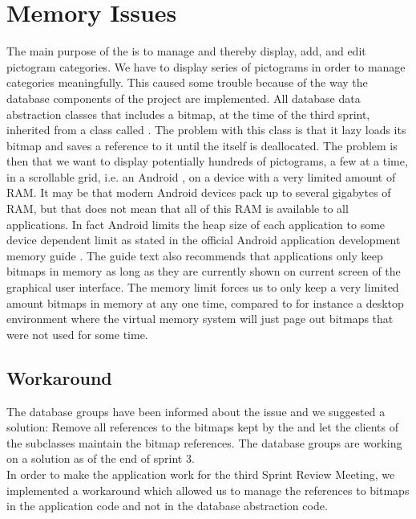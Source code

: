 
\section{Memory Issues}
\label{sec:memory_issues}

The main purpose of the \ct is to manage and thereby display, add, and edit pictogram categories. We have to display series of pictograms in order to manage categories meaningfully. This caused some trouble because of the way the database components of the project are implemented. All database data abstraction classes that includes a bitmap, at the time of the third sprint, inherited from a class called . The problem with this class is that it lazy loads its bitmap and saves a reference to it until the  itself is deallocated. The problem is then that we want to display potentially hundreds of pictograms, a few at a time, in a scrollable grid, i.e. an Android , on a device with a very limited amount of RAM. It may be that modern Android devices pack up to several gigabytes of RAM, but that does not mean that all of this RAM is available to all applications. In fact Android limits the heap size of each application to some device dependent limit as stated in the official Android application development memory guide \parencite{android_memory}. The guide text also recommends that applications only keep bitmaps in memory as long as they are currently shown on current screen of the graphical user interface. The memory limit forces us to only keep a very limited amount bitmaps in memory at any one time, compared to for instance a desktop environment where the virtual memory system will just page out bitmaps that were not used for some time. 

\subsection{Workaround}
\label{subsec:pictogram_workaround}

The database groups have been informed about the issue and we suggested a solution: Remove all references to the bitmaps kept by the  and let the clients of the  subclasses maintain the bitmap references. The database groups are working on a solution as of the end of sprint 3. \\

In order to make the \ct application work for the third Sprint Review Meeting, we implemented a workaround which allowed us to manage the references to bitmaps in the application code and not in the database abstraction code. \\

